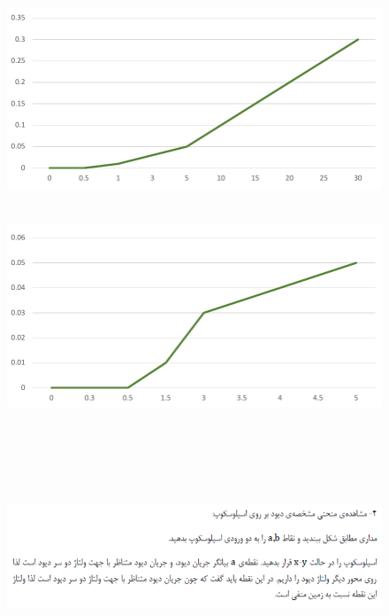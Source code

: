 \documentclass[12pt]{article}
\begin{document}
\begin{figure}[H]
	\begin{center}
		\includegraphics[width=\textwidth, height=6cm]{./images/7.8}
	\end{center}
\end{figure}

\begin{figure}[H]
	\begin{center}
		\includegraphics[width=\textwidth, height=6cm]{./images/7.9}
	\end{center}
\end{figure}

\section{}

\begin{figure}[H]
	\begin{center}
		\includegraphics[width=\textwidth, height=6cm]{./images/7.10}
	\end{center}
\end{figure}
\end{document}
